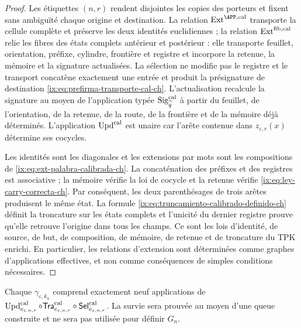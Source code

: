 \begin{proof}
Les étiquettes \((n,r)\) rendent disjointes les copies des porteurs et fixent
sans ambiguïté chaque origine et destination. La relation
\(\operatorname{Ext}^{\APP,\rm cal}\) transporte la cellule complète et
préserve les deux identités euclidiennes ; la relation
\(\operatorname{Ext}^{\rm fib,cal}\) relie les fibres des états
complets antérieur et postérieur : elle transporte feuillet, orientation, préfixe,
cylindre, frontière et registre et incorpore la retenue, la mémoire et la signature
actualisées. La sélection ne modifie pas le registre et le transport concatène
exactement une entrée et produit la présignature de destination
\eqref{ix:eq:prefirma-transporte-cal-ch}. L’actualisation recalcule la signature au moyen de
l’application typée \(\operatorname{Sig}^{\rm cal}_{\widetilde q}\) à partir du
feuillet, de l’orientation, de la retenue, de la route, de la frontière et de la mémoire déjà déterminés. L’application
\(\operatorname{Upd}^{\rm cal}\) est unaire car l’arête contenue dans
\(z_{\varepsilon,r}(x)\) détermine ses cocycles.

Les identités sont les diagonales et les extensions par mots sont les
compositions de \eqref{ix:eq:ext-palabra-calibrada-ch}. La concaténation des
préfixes et des registres est associative ; la mémoire vérifie la loi de cocycle et
la retenue vérifie
\eqref{ix:eq:ley-carry-correcta-ch}. Par conséquent, les deux parenthésages de trois
arêtes produisent le même état. La formule
\eqref{ix:eq:truncamiento-calibrado-definido-ch} définit la troncature sur
les états complets et l’unicité du dernier registre prouve qu’elle retrouve
l’origine dans tous les champs. Ce sont les lois d’identité, de source,
de but, de composition, de mémoire, de retenue et de troncature du TPK enrichi.
En particulier, les relations d’extension sont déterminées comme graphes
d’applications effectives, et non comme conséquences de simples conditions
nécessaires.
\end{proof}

Chaque \(\gamma_{\varepsilon,k_n}\) comprend exactement neuf applications de \(\operatorname{Upd}^{\rm cal}_{e_{\varepsilon,n,r}}\circ
\mathsf{Tra}^{\rm cal}_{e_{\varepsilon,n,r}}\circ
\mathsf{Sel}^{\rm cal}_{e_{\varepsilon,n,r}}\). La survie sera prouvée au moyen d'une queue construite et ne sera pas utilisée pour définir \(G_n\).

